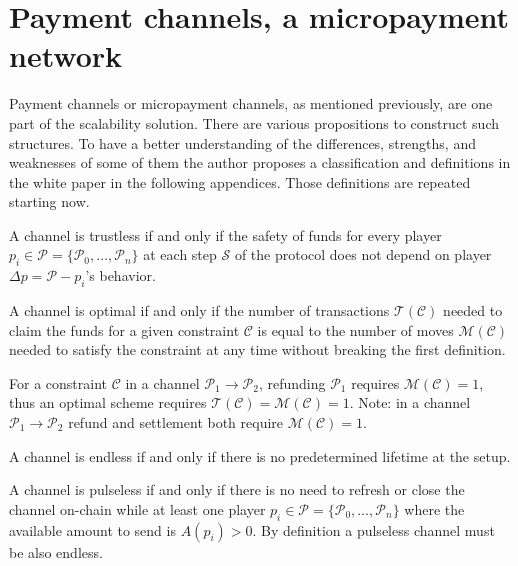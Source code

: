 \chapter{Payment channels, a micropayment network}
\label{chap:paymentChannels}

Payment channels or micropayment channels, as mentioned previously, are one part
of the scalability solution. There are various propositions to construct
such structures. To have a better understanding of the differences, strengths, and
weaknesses of some of them the author proposes a classification and definitions
in the white paper in the following appendices. Those definitions are repeated starting
now.

\begin{definition}[Trustless]
  A channel is trustless if and only if the safety of funds for every player
  $p_i \in \mathcal{P} = \{\mathcal{P}_0, \dots, \mathcal{P}_n\}$
  at each step $\mathcal{S}$ of the protocol does not depend on
  player $\Delta p = \mathcal{P} - p_i$'s behavior.
\end{definition}

\begin{definition}[Optimal]
  A channel is optimal if and only if the number of transactions $\mathcal{T}(\mathcal{C})$
  needed to claim the funds for a given constraint $\mathcal{C}$ is equal to
  the number of moves $\mathcal{M}(\mathcal{C})$ needed to satisfy the constraint
  at any time without breaking the first definition.

  For a constraint $\mathcal{C}$ in a channel $\mathcal{P}_1 \rightarrow \mathcal{P}_2$,
  refunding $\mathcal{P}_1$ requires $\mathcal{M}(\mathcal{C}) = 1$, thus
  an optimal scheme requires $\mathcal{T}(\mathcal{C}) = \mathcal{M}(\mathcal{C}) = 1$.
  Note: in a channel $\mathcal{P}_1 \rightarrow \mathcal{P}_2$ refund and settlement both
  require $\mathcal{M}(\mathcal{C}) = 1$.
\end{definition}

\begin{definition}[Endless]
  A channel is endless if and only if there is no predetermined lifetime at the setup.
\end{definition}

\begin{definition}[Pulseless]
  A channel is pulseless if and only if there is no need to refresh or close the
  channel on-chain while at least one player $p_i \in \mathcal{P} = \{\mathcal{P}_0,
  \dots, \mathcal{P}_n\}$ where the available amount to send is $A(p_i) > 0$. By
  definition a pulseless channel must be also endless.
\end{definition}

